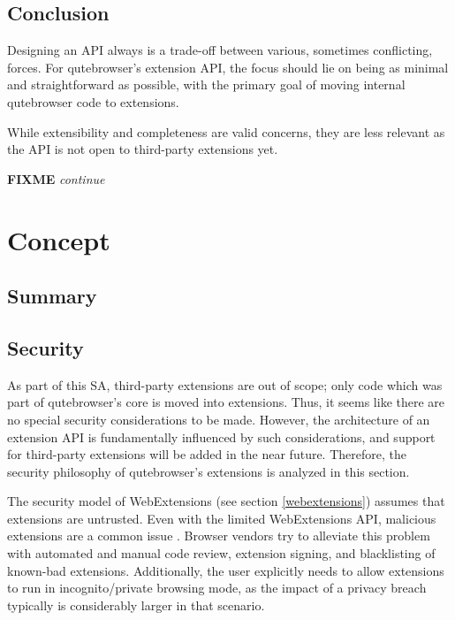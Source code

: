 \documentclass[a4paper,parskip=full]{scrreprt}
\newcommand{\fixme}[1]{\textbf{FIXME} \emph{#1}}
\begin{document}
\section{Conclusion}
Designing an API always is a trade-off between various, sometimes conflicting,
forces. For qutebrowser's extension API, the focus should lie on being as
minimal and straightforward as possible, with the primary goal of moving
internal qutebrowser code to extensions.

While extensibility and completeness are valid concerns, they are less relevant
as the API is not open to third-party extensions yet.

\fixme{continue}


\chapter{Concept}

\section{Summary}

\section{Security}
\label{security}
As part of this SA, third-party extensions are out of scope; only code which was
part of qutebrowser's core is moved into extensions. Thus, it seems like there
are no special security considerations to be made. However, the architecture of
an extension API is fundamentally influenced by such considerations, and support
for third-party extensions will be added in the near future. Therefore, the
security philosophy of qutebrowser's extensions is analyzed in this section.

The security model of WebExtensions (see section \ref{webextensions}) assumes
that extensions are untrusted. Even with the limited WebExtensions API,
malicious extensions are a common issue
\citep{mozilla-signing,mozilla-trustworthy}. Browser vendors try to alleviate
this problem with automated and manual code review, extension signing, and
blacklisting of known-bad extensions. Additionally, the user explicitly needs to
allow extensions to run in incognito/private browsing mode, as the impact of a
privacy breach typically is considerably larger in that scenario.
\end{document}
